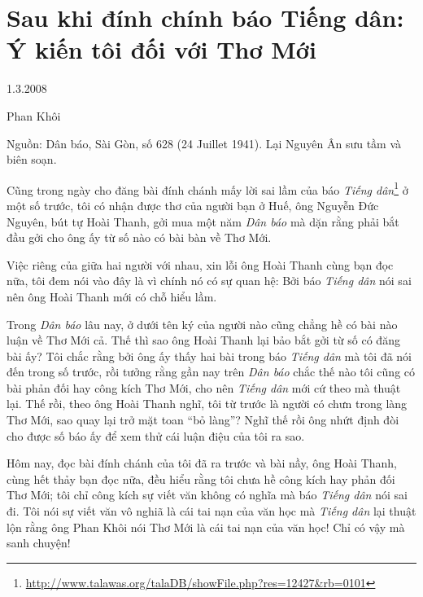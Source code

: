 \documentclass[../main.tex]{subfiles}
\begin{document}
\chapter{Sau khi đính chính báo Tiếng dân: Ý kiến tôi đối với Thơ Mới}

\begin{metadata}

\begin{flushright}1.3.2008\end{flushright}

Phan Khôi

Nguồn: Dân báo, Sài Gòn, số 628 (24 Juillet 1941). Lại Nguyên Ân sưu tầm và biên soạn.

\end{metadata}

\begin{multicols}{2}

Cũng trong ngày cho đăng bài đính chánh mấy lời sai lầm của báo \textit{Tiếng dân}\footnote{\url{http://www.talawas.org/talaDB/showFile.php?res=12427&rb=0101}} ở một số trước, tôi có nhận được thơ của người bạn ở Huế, ông Nguyễn Đức Nguyên, bút tự Hoài Thanh, gởi mua một năm \textit{Dân báo} mà dặn rằng phải bắt đầu gởi cho ông ấy từ số nào có bài bàn về Thơ Mới. 
 
Việc riêng của giữa hai người với nhau, xin lỗi ông Hoài Thanh cùng bạn đọc nữa, tôi đem nói vào đây là vì chính nó có sự quan hệ: Bởi báo \textit{Tiếng dân} nói sai nên ông Hoài Thanh mới có chỗ hiểu lầm. 
 
Trong \textit{Dân báo} lâu nay, ở dưới tên ký của người nào cũng chẳng hề có bài nào luận về Thơ Mới cả. Thế thì sao ông Hoài Thanh lại bảo bắt gởi từ số có đăng bài ấy? Tôi chắc rằng bởi ông ấy thấy hai bài trong báo \textit{Tiếng dân} mà tôi đã nói đến trong số trước, rồi tưởng rằng gần nay trên \textit{Dân báo} chắc thế nào tôi cũng có bài phản đối hay công kích Thơ Mới, cho nên \textit{Tiếng dân} mới cứ theo mà thuật lại. Thế rồi, theo ông Hoài Thanh nghĩ, tôi từ trước là người có chưn trong làng Thơ Mới, sao quay lại trở mặt toan “bỏ làng”? Nghĩ thế rồi ông nhứt định đòi cho được số báo ấy để xem thử cái luận điệu của tôi ra sao. 
 
Hôm nay, đọc bài đính chánh của tôi đã ra trước và bài nầy, ông Hoài Thanh, cùng hết thảy bạn đọc nữa, đều hiểu rằng tôi chưa hề công kích hay phản đối Thơ Mới; tôi chỉ công kích sự viết văn không có nghĩa mà báo \textit{Tiếng dân} nói sai đi. Tôi nói sự viết văn vô nghiã là cái tai nạn của văn học mà \textit{Tiếng dân} lại thuật lộn rằng ông Phan Khôi nói Thơ Mới là cái tai nạn của văn học! Chỉ có vậy mà sanh chuyện! 
 

\end{multicols}
\end{document}
